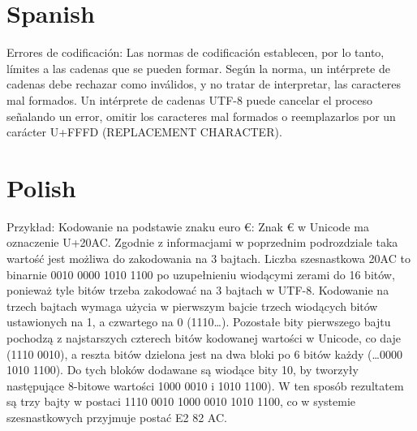 \section{Spanish}
Errores de codificación: Las normas de codificación establecen, por lo tanto, límites a las cadenas que se pueden formar. Según la norma, un intérprete de cadenas debe rechazar como inválidos, y no tratar de interpretar, las caracteres mal formados. Un intérprete de cadenas UTF-8 puede cancelar el proceso señalando un error, omitir los caracteres mal formados o reemplazarlos por un carácter U+FFFD (REPLACEMENT CHARACTER).

\section{Polish}
Przykład: Kodowanie na podstawie znaku euro €: Znak € w Unicode ma oznaczenie U+20AC. Zgodnie z informacjami w poprzednim podrozdziale taka wartość jest możliwa do zakodowania na 3 bajtach. Liczba szesnastkowa 20AC to binarnie 0010 0000 1010 1100 po uzupełnieniu wiodącymi zerami do 16 bitów, ponieważ tyle bitów trzeba zakodować na 3 bajtach w UTF-8.    Kodowanie na trzech bajtach wymaga użycia w pierwszym bajcie trzech wiodących bitów ustawionych na 1, a czwartego na 0 (1110…). Pozostałe bity pierwszego bajtu pochodzą z najstarszych czterech bitów kodowanej wartości w Unicode, co daje (1110 0010), a reszta bitów dzielona jest na dwa bloki po 6 bitów każdy (…0000 1010 1100). Do tych bloków dodawane są wiodące bity 10, by tworzyły następujące 8-bitowe wartości 1000 0010 i 1010 1100). W ten sposób rezultatem są trzy bajty w postaci 1110 0010 1000 0010 1010 1100, co w systemie szesnastkowych przyjmuje postać E2 82 AC.
